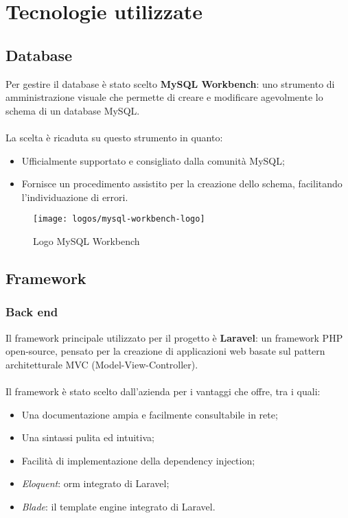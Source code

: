 \section{Tecnologie utilizzate}
\subsection{Database}
Per gestire il database è stato scelto \textbf{MySQL Workbench}: uno strumento di amministrazione visuale che permette di creare e modificare agevolmente lo schema di un database MySQL.
\\ \\
La scelta è ricaduta su questo strumento in quanto: 
\begin{itemize}
	\item Ufficialmente supportato e consigliato dalla comunità MySQL;
	\item Fornisce un procedimento assistito per la creazione dello schema, facilitando l'individuazione di errori.
\end{itemize}

\begin{figure}[htbp]
\begin{center}
\texttt{[image: logos/mysql-workbench-logo]}
\caption{Logo MySQL Workbench}
\end{center}
\end{figure}

\subsection{Framework}
\subsubsection{Back end}
Il framework principale utilizzato per il progetto è \textbf{Laravel}: un framework PHP open-source, pensato per la creazione di applicazioni web basate sul pattern architetturale MVC (Model-View-Controller). 
\\ \\
Il framework è stato scelto dall'azienda per i vantaggi che offre, tra i quali:
\begin{itemize}
	\item Una documentazione ampia e facilmente consultabile in rete;
	\item Una sintassi pulita ed intuitiva;
	\item Facilità di implementazione della dependency injection;
	\item \textit{Eloquent}: \gls{orm}\glsfirstoccur{} integrato di Laravel;
	\item \textit{Blade}: il template engine integrato di Laravel.
\end{itemize}

